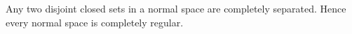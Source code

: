 Any two disjoint closed sets in a normal space are completely separated. Hence every normal space is completely regular.
